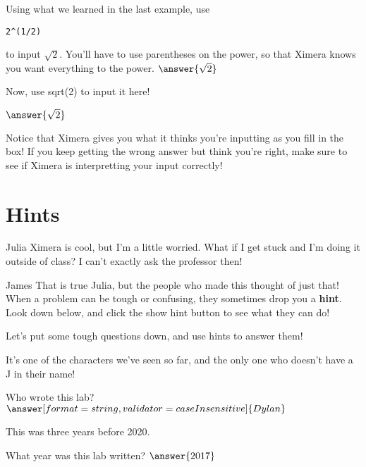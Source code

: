 \documentclass{ximera}
\begin{document}
\begin{question}
Using what we learned in the last example, use
\begin{verbatim}
2^(1/2)
\end{verbatim}
to input $\sqrt{2}$. You'll have to use parentheses on the power, so that Ximera knows you want everything to the power.
$\answer{\sqrt{2}}$
\end{question}
\begin{question}
Now, use sqrt(2) to input it here!

$\answer{\sqrt{2}}$
\begin{feedback}[correct]
Notice that Ximera gives you what it thinks you're inputting as you fill in the box! If you keep getting the wrong answer but think you're right, make sure to see if Ximera is interpretting your input correctly!
\end{feedback}
\end{question}

\section{Hints}
\begin{dialogue}
\item[Julia] Ximera is cool, but I'm a little worried. What if I get stuck and I'm doing it outside of class? I can't exactly ask the professor then!
\item[James] That is true Julia, but the people who made this thought of just that! When a problem can be tough or confusing, they sometimes drop you a \textbf{hint}. Look down below, and click the show hint button to see what they can do!
\end{dialogue}

Let's put some tough questions down, and use hints to answer them!
\begin{question}
\begin{hint}
It's one of the characters we've seen so far, and the only one who doesn't have a J in their name!
\end{hint}
Who wrote this lab?
$\answer[format=string,validator=caseInsensitive]{Dylan}$
\end{question}
\begin{question}
\begin{hint}
This was three years before 2020.
\end{hint}
What year was this lab written?
$\answer{2017}$
\end{question}
\end{document}
